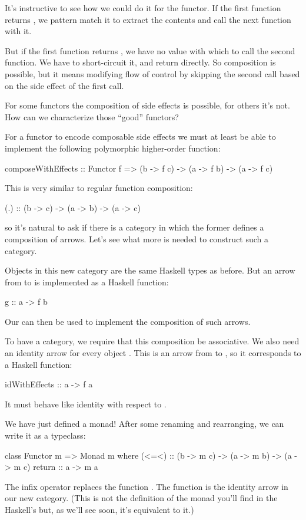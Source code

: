 \documentclass[DaoFP]{subfiles}
\begin{document}
It's instructive to see how we could do it for the  functor. If the first function returns , we pattern match it to extract the contents and call the next function with it.

But if the first function returns , we have no value with which to call the second function. We have to short-circuit it, and return  directly. So composition is possible, but it means modifying flow of control by skipping the second call based on the side effect of the first call. 

For some functors the composition of side effects is possible, for others it's not. How can we characterize those ``good'' functors?

For a functor to encode composable side effects we must at least be able to implement the following polymorphic higher-order function: 
\begin{haskell}
composeWithEffects :: Functor f => 
       (b -> f c) -> (a -> f b) -> (a -> f c)
\end{haskell}
This is very similar to regular function composition:
\begin{haskell}
(.) :: (b -> c) -> (a -> b) -> (a -> c)
\end{haskell}
so it's natural to ask if there is a category in which the former defines a composition of arrows. Let's see what more is needed to construct such a category.

Objects in this new category are the same Haskell types as before. But an arrow from  to  is implemented as a Haskell function:
\begin{haskell}
g :: a -> f b
\end{haskell}
Our  can then be used to implement the composition of such arrows. 

To have a category, we require that this composition be associative. We also need an identity arrow for every object . This is an arrow from  to , so it corresponds to a Haskell function:
\begin{haskell}
idWithEffects :: a -> f a
\end{haskell}
It must behave like identity with respect to .

We have just defined a monad! After some renaming and rearranging, we can write it as a typeclass:
\begin{haskell}
class Functor m => Monad m where
  (<=<) :: (b -> m c) -> (a -> m b) -> (a -> m c)
  return :: a -> m a
\end{haskell}
The infix operator \hask{<=<} replaces the function . The  function is the identity arrow in our new category. (This is not the definition of the monad you'll find in the Haskell's  but, as we'll see soon, it's equivalent to it.)
\end{document}
